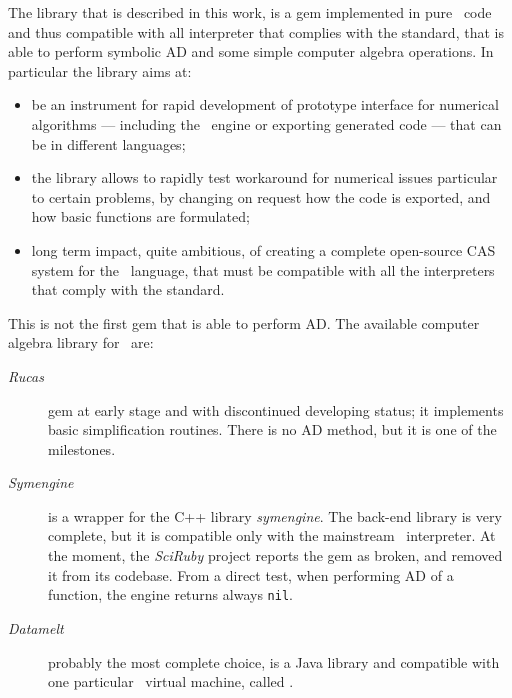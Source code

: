 The library that is described in this work, is a gem implemented in pure \Ruby~code and thus compatible with all interpreter that complies with the standard, that is able to perform symbolic AD and some simple computer algebra operations. In particular the library aims at:
\begin{itemize}
  \item be an instrument for rapid development of prototype interface for numerical algorithms --- including the \Mruby~engine or exporting generated code --- that can be in different languages;
  \item the library allows to rapidly test workaround for numerical issues particular to certain problems, by changing on request how the code is exported, and how basic functions are formulated;
  \item long term impact, quite ambitious, of creating a complete open-source CAS system for the \Ruby~language, that must be compatible with all the interpreters that comply with the standard.
\end{itemize}

This is not the first gem that is able to perform AD. The available computer algebra library for \Ruby~are:
\begin{description}
  \item [\emph{Rucas}] gem at early stage and with discontinued developing status; it implements basic simplification routines. There is no AD method, but it is one of the milestones.
  \item [\emph{Symengine}] is a wrapper for the C++ library \emph{symengine}. The back-end library is very complete, but it is compatible only with the mainstream \Ruby~interpreter. At the moment, the \emph{SciRuby} project reports the gem as broken, and removed it from its codebase. From a direct test, when performing AD of a function, the engine returns always \texttt{nil}.
  \item [\emph{Datamelt}] probably the most complete choice, is a Java library and compatible with one particular \Ruby~virtual machine, called \Jruby.
\end{description}
